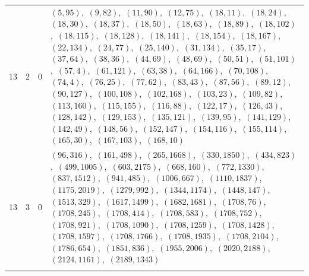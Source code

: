 \documentclass[11pt]{article}
\begin{document}
\begin{longtable}{@{}rrl>{\raggedright\arraybackslash}p{}@{}}
13 & 2 & $0$ & $(5,95)$,\allowbreak\ $(9,82)$,\allowbreak\ $(11,90)$,\allowbreak\ $(12,75)$,\allowbreak\ $(18,11)$,\allowbreak\ $(18,24)$,\allowbreak\ $(18,30)$,\allowbreak\ $(18,37)$,\allowbreak\ $(18,50)$,\allowbreak\ $(18,63)$,\allowbreak\ $(18,89)$,\allowbreak\ $(18,102)$,\allowbreak\ $(18,115)$,\allowbreak\ $(18,128)$,\allowbreak\ $(18,141)$,\allowbreak\ $(18,154)$,\allowbreak\ $(18,167)$,\allowbreak\ $(22,134)$,\allowbreak\ $(24,77)$,\allowbreak\ $(25,140)$,\allowbreak\ $(31,134)$,\allowbreak\ $(35,17)$,\allowbreak\ $(37,64)$,\allowbreak\ $(38,36)$,\allowbreak\ $(44,69)$,\allowbreak\ $(48,69)$,\allowbreak\ $(50,51)$,\allowbreak\ $(51,101)$,\allowbreak\ $(57,4)$,\allowbreak\ $(61,121)$,\allowbreak\ $(63,38)$,\allowbreak\ $(64,166)$,\allowbreak\ $(70,108)$,\allowbreak\ $(74,4)$,\allowbreak\ $(76,25)$,\allowbreak\ $(77,62)$,\allowbreak\ $(83,43)$,\allowbreak\ $(87,56)$,\allowbreak\ $(89,12)$,\allowbreak\ $(90,127)$,\allowbreak\ $(100,108)$,\allowbreak\ $(102,168)$,\allowbreak\ $(103,23)$,\allowbreak\ $(109,82)$,\allowbreak\ $(113,160)$,\allowbreak\ $(115,155)$,\allowbreak\ $(116,88)$,\allowbreak\ $(122,17)$,\allowbreak\ $(126,43)$,\allowbreak\ $(128,142)$,\allowbreak\ $(129,153)$,\allowbreak\ $(135,121)$,\allowbreak\ $(139,95)$,\allowbreak\ $(141,129)$,\allowbreak\ $(142,49)$,\allowbreak\ $(148,56)$,\allowbreak\ $(152,147)$,\allowbreak\ $(154,116)$,\allowbreak\ $(155,114)$,\allowbreak\ $(165,30)$,\allowbreak\ $(167,103)$,\allowbreak\ $(168,10)$\\
13 & 3 & $0$ & $(96,316)$,\allowbreak\ $(161,498)$,\allowbreak\ $(265,1668)$,\allowbreak\ $(330,1850)$,\allowbreak\ $(434,823)$,\allowbreak\ $(499,1005)$,\allowbreak\ $(603,2175)$,\allowbreak\ $(668,160)$,\allowbreak\ $(772,1330)$,\allowbreak\ $(837,1512)$,\allowbreak\ $(941,485)$,\allowbreak\ $(1006,667)$,\allowbreak\ $(1110,1837)$,\allowbreak\ $(1175,2019)$,\allowbreak\ $(1279,992)$,\allowbreak\ $(1344,1174)$,\allowbreak\ $(1448,147)$,\allowbreak\ $(1513,329)$,\allowbreak\ $(1617,1499)$,\allowbreak\ $(1682,1681)$,\allowbreak\ $(1708,76)$,\allowbreak\ $(1708,245)$,\allowbreak\ $(1708,414)$,\allowbreak\ $(1708,583)$,\allowbreak\ $(1708,752)$,\allowbreak\ $(1708,921)$,\allowbreak\ $(1708,1090)$,\allowbreak\ $(1708,1259)$,\allowbreak\ $(1708,1428)$,\allowbreak\ $(1708,1597)$,\allowbreak\ $(1708,1766)$,\allowbreak\ $(1708,1935)$,\allowbreak\ $(1708,2104)$,\allowbreak\ $(1786,654)$,\allowbreak\ $(1851,836)$,\allowbreak\ $(1955,2006)$,\allowbreak\ $(2020,2188)$,\allowbreak\ $(2124,1161)$,\allowbreak\ $(2189,1343)$\\
\addlinespace[3pt]
\end{longtable}
\endgroup
\end{document}
